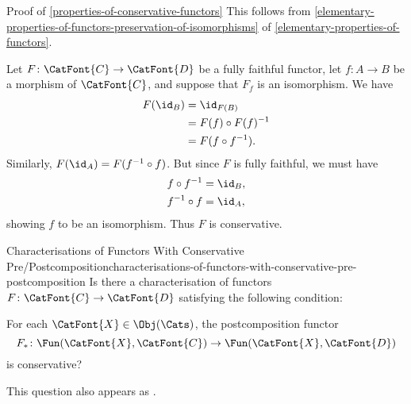 \begin{Proof}{Proof of \cref{properties-of-conservative-functors}}%
    This follows from \cref{elementary-properties-of-functors-preservation-of-isomorphisms} of \cref{elementary-properties-of-functors}.

    Let $F\colon\CatFont{C}\to\CatFont{D}$ be a fully faithful functor, let $f\colon A\to B$ be a morphism of $\CatFont{C}$, and suppose that $F_{f}$ is an isomorphism. We have
    \begin{align*}
        F(\id_{B}) &= \id_{F(B)}\\
                   &= F(f)\circ F(f)^{-1}\\
                   &= F(f\circ f^{-1}).
    \end{align*}
    Similarly, $F(\id_{A})=F(f^{-1}\circ f)$. But since $F$ is fully faithful, we must have
    \begin{align*}
        f\circ f^{-1} &= \id_{B},\\
        f^{-1}\circ f &= \id_{A},
    \end{align*}
    showing $f$ to be an isomorphism. Thus $F$ is conservative.
\end{Proof}
\begin{question}{Characterisations of Functors With Conservative Pre/Postcomposition}{characterisations-of-functors-with-conservative-pre-postcomposition}%
    Is there a characterisation of functors $F\colon\CatFont{C}\to\CatFont{D}$ satisfying the following condition:
    \begin{itemize}
        \itemstar For each $\CatFont{X}\in\Obj(\Cats)$, the postcomposition functor
            \[
                F_{*}%
                \colon%
                \Fun(\CatFont{X},\CatFont{C})%
                \to%
                \Fun(\CatFont{X},\CatFont{D})%
            \]%
            is conservative?
    \end{itemize}
    This question also appears as \cite{MO468125}.
\end{question}
